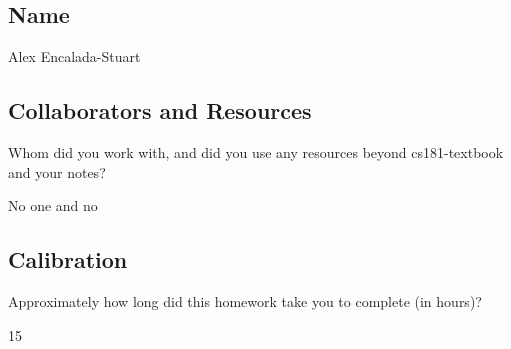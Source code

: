 \documentclass[submit]{harvardml}
\begin{document}
\newpage
\newpage
\newpage
\subsection*{Name}

Alex Encalada-Stuart

\subsection*{Collaborators and Resources}
Whom did you work with, and did you use any resources beyond cs181-textbook and your notes?

No one and no

\subsection*{Calibration}
Approximately how long did this homework take you to complete (in hours)? 

15
\end{document}
